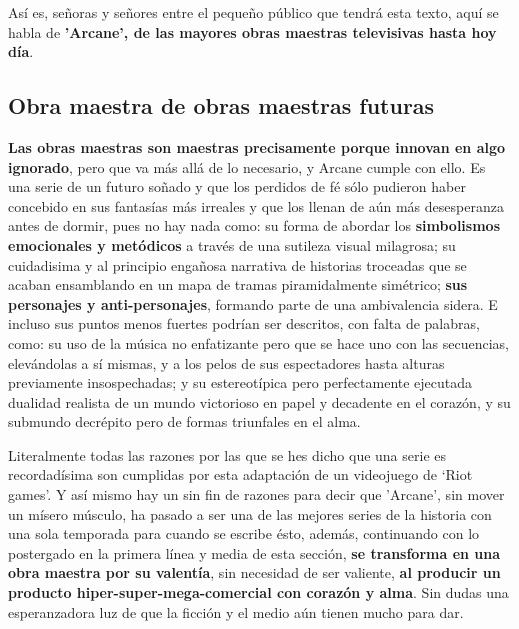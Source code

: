\documentclass[11pt,a5paper]{article}
\begin{document}
Así es, señoras y señores entre el pequeño público que tendrá esta texto, aquí se habla de {\textbf{'Arcane', de las mayores obras maestras televisivas hasta hoy día}}.

    \subsection*{{\large{\textsf{\hspace{1cm}Obra maestra de obras maestras futuras}}}}

{\textbf{Las obras maestras son maestras precisamente porque innovan en algo ignorado}}, pero que va más allá de lo necesario, y Arcane cumple con ello. Es una serie de un futuro soñado y que los perdidos de fé sólo pudieron haber concebido en sus fantasías más irreales y que los llenan de aún más desesperanza antes de dormir, pues no hay nada como: su forma de abordar los {\textbf{simbolismos emocionales y metódicos}} a través de una sutileza visual milagrosa; su cuidadisima y al principio engañosa narrativa de historias troceadas que se acaban ensamblando en un mapa de tramas piramidalmente simétrico; {\textbf{sus personajes y anti-personajes}}, formando parte de una ambivalencia sidera. E incluso sus puntos menos fuertes podrían ser descritos, con falta de palabras, como: su uso de la música no enfatizante pero que se hace uno con las secuencias, elevándolas a sí mismas,  y a los pelos de sus espectadores hasta alturas previamente insospechadas; y su estereotípica pero perfectamente ejecutada dualidad realista de un mundo victorioso en papel y decadente en el corazón, y su submundo decrépito pero de formas triunfales en el alma.\newline

Literalmente todas las razones por las que se hes dicho que una serie es recordadísima son cumplidas por esta adaptación de un videojuego de ‘Riot games’. Y así mismo hay un sin fin de razones para decir que 'Arcane', sin mover un mísero músculo, ha pasado a ser una de las mejores series de la historia con una sola temporada para cuando se escribe ésto, además, continuando con lo postergado en la primera línea y media de esta sección, {\textbf{se transforma en una obra maestra por su valentía}}, sin necesidad de ser valiente, {\textbf{al producir un producto hiper-super-mega-comercial con corazón y alma}}. Sin dudas una esperanzadora luz de que la ficción y el medio aún tienen mucho para dar.\newline
\end{document}
